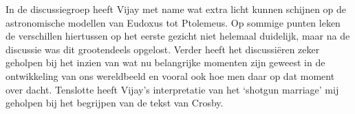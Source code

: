 \documentclass[a4paper,11pt]{article}
\begin{document}
In de discussiegroep heeft Vijay met name wat extra licht kunnen schijnen op
de astronomische modellen van Eudoxus tot Ptolemeus. Op sommige punten leken
de verschillen hiertussen op het eerste gezicht niet helemaal duidelijk, maar
na de discussie was dit grootendeels opgelost. Verder heeft het discussi\"eren
zeker geholpen bij het inzien van wat nu belangrijke momenten zijn geweest in
de ontwikkeling van ons wereldbeeld en vooral ook hoe men daar op dat moment
over dacht. Tenslotte heeft Vijay's interpretatie van het `shotgun marriage'
mij geholpen bij het begrijpen van de tekst van Crosby.
\end{document}
